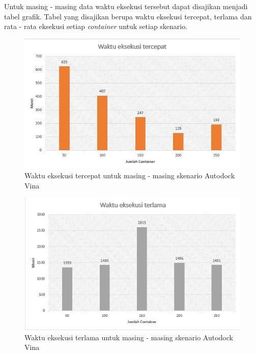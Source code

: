 Untuk masing - masing data waktu eksekusi tersebut dapat disajikan menjadi tabel grafik. Tabel yang disajikan berupa waktu eksekusi tercepat, terlama dan rata - rata eksekusi setiap \textit{container} untuk setiap skenario.

\begin{figure}
	\centering
	\includegraphics{tercepat_vina.PNG}
	\caption{Waktu eksekusi tercepat untuk masing - masing skenario Autodock Vina}
\end{figure}
 
\begin{figure}
\includegraphics{terlama_vina.PNG}
\caption{Waktu eksekusi terlama untuk masing - masing skenario Autodock Vina}
\end{figure}

